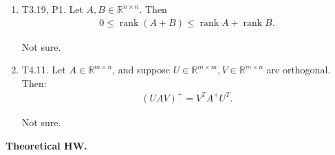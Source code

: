 \documentclass{article}
\newcommand{\RR}{\mathbb{R}}
\DeclareMathOperator{\rank}{rank}
\begin{document}
\begin{enumerate}
    \item T3.19, P1. Let $A, B \in \RR^{n \times n}$.  Then
      \begin{align*}
        0 \leq \rank (A+B) \leq \rank A + \rank B.
      \end{align*}

      Not sure.

    \item T4.11. Let $A \in \RR^{m \times n}$, and suppose $U \in \RR^{m \times m}, V \in \RR^{m \times n}$ are orthogonal.  Then:
      \begin{align*}
        (U A V)^{+} = V^T A^{+} U^T.
      \end{align*}

      Not sure.
\end{enumerate}

{\bf Theoretical HW.}
\end{document}
